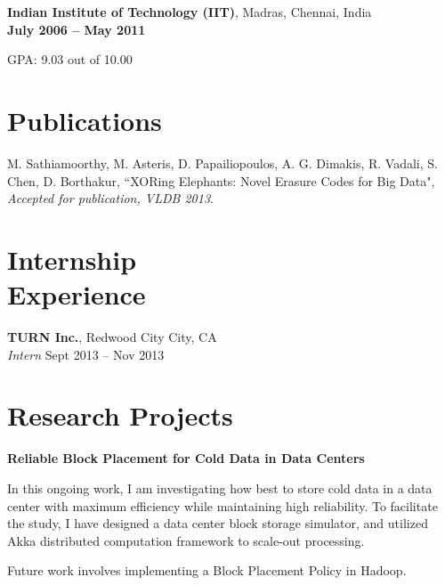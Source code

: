 \documentclass[margin,line]{resume}
\begin{document}
\begin{resume}
    
    \textbf{Indian Institute of Technology (IIT)}, Madras, Chennai, India \\%
    \textsl{} \hfill \textbf{ July 2006 -- May 2011}\vspace{-3mm}\\\vspace{-1mm}%
    \begin{list2}
    		\item GPA:	9.03 out of 10.00
    \end{list2}\vspace{-1.5mm}%


\section{\mysidestyle Publications}
\begin{list2}  
   \item M. Sathiamoorthy, M. Asteris, D. Papailiopoulos, A. G. Dimakis, R. Vadali, S. Chen, D. Borthakur,
      ``XORing Elephants: Novel Erasure Codes for Big Data", \textsl{Accepted for publication, VLDB 2013}.
    \end{list2}

\section{\mysidestyle Internship\\Experience}

	\textbf{TURN Inc.}, Redwood City City, CA\\
    \textsl{Intern} \hfill Sept 2013 -- Nov 2013
    

\section{\mysidestyle Research Projects}
  \textbf{Reliable Block Placement for Cold Data in Data Centers} 
  \begin{list2}
  \item In this ongoing work, I am investigating how best to store cold data in a data center with maximum efficiency while maintaining high reliability. To facilitate the study, I have designed a data center block storage simulator, and utilized Akka distributed computation framework to scale-out processing.
\newpage
  \item Future work involves implementing a Block Placement Policy in Hadoop.
  \end{list2} 



\end{resume}
\end{document}

